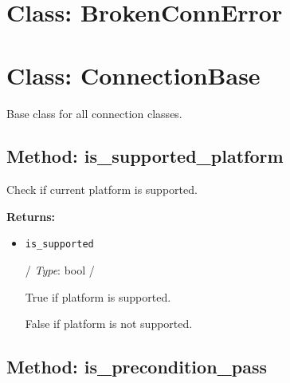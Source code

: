 %
%

\hypertarget{qconnectbase-connection-base-class-brokenconnerror-2}{%
\section{Class: BrokenConnError}\label{qconnectbase-connection-base-class-brokenconnerror-2}}

\begin{Shaded}
\begin{Highlighting}[]
\end{Highlighting}
\end{Shaded}

\hypertarget{qconnectbase-connection-base-class-connectionbase-3}{%
\section{Class: ConnectionBase}\label{qconnectbase-connection-base-class-connectionbase-3}}

\begin{Shaded}
\begin{Highlighting}[]
\end{Highlighting}
\end{Shaded}

Base class for all connection classes.

\hypertarget{qconnectbase-connection-base-method-is_supported_platform-4}{%
\subsection{Method:
is\_supported\_platform}\label{qconnectbase-connection-base-method-is_supported_platform-4}}

Check if current platform is supported.

\textbf{Returns:}

\begin{itemize}
\item
  \texttt{is\_supported}

  / \emph{Type}: bool /

  True if platform is supported.

  False if platform is not supported.
\end{itemize}

\hypertarget{qconnectbase-connection-base-method-is_precondition_pass-5}{%
\subsection{Method:
is\_precondition\_pass}\label{qconnectbase-connection-base-method-is_precondition_pass-5}}

